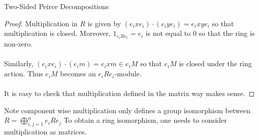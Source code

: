 \documentclass[a4paper]{article}
\begin{document}
\begin{thm}{Two-Sided Peirce Decompositions}{}
\begin{proof}
Multiplication in $R$ is given by $(e_ixe_i)\cdot(e_iye_i)=e_ixye_i$ so that multiplication is closed. Moreover, $1_{e_iRe_i}=e_i$ is not equal to $0$ so that the ring is non-zero. \\~\\

Similarly, $(e_ixe_i)\cdot(e_im)=e_ixm\in e_iM$ so that $e_iM$ is closed under the ring action. Thus $e_iM$ becomes an $e_iRe_i$-module. \\~\\

It is easy to check that multiplication defined in the matrix way makes sense. 
\end{proof}
\end{thm}

Note component wise multiplication only defines a group isomorphism between $R=\bigoplus_{i,j=1}^ne_iRe_j$ To obtain a ring isomorphism, one needs to consider multiplication as matrices. 
\end{document}
